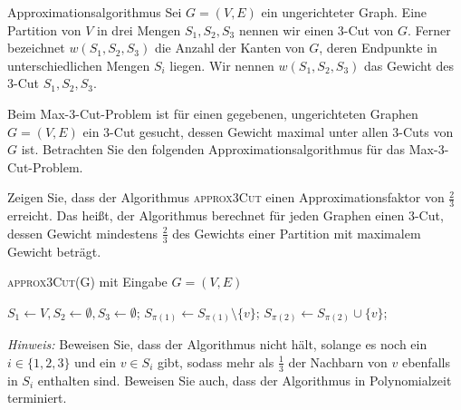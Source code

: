 \documentclass[answers]{submit}
\begin{document}
\begin{exercise}[6]{Approximationsalgorithmus}
  Sei $G=(V,E)$ ein ungerichteter Graph.
  Eine Partition von $V$ in drei Mengen $S_1,S_2,S_3$ nennen wir einen 3-Cut von $G$.
  Ferner bezeichnet $w(S_1,S_2,S_3)$ die Anzahl der Kanten von $G$, deren Endpunkte in unterschiedlichen Mengen $S_i$ liegen.
  Wir nennen $w(S_1,S_2,S_3)$ das Gewicht des 3-Cut $S_1,S_2,S_3$.

  Beim Max-3-Cut-Problem ist für einen gegebenen, ungerichteten Graphen $G=(V,E)$ ein 3-Cut gesucht, dessen Gewicht maximal unter allen 3-Cuts von $G$ ist.
  Betrachten Sie den folgenden Approximationsalgorithmus für das Max-3-Cut-Problem.

  Zeigen Sie, dass der Algorithmus \textsc{approx3Cut} einen Approximationsfaktor von $\frac{2}{3}$ erreicht.
  Das heißt, der Algorithmus berechnet für jeden Graphen einen 3-Cut, dessen Gewicht mindestens $\frac{2}{3}$ des Gewichts einer Partition mit maximalem Gewicht beträgt.

  \begin{algorithm}
    \caption{\textsc{approx3Cut}(G) mit Eingabe $G=(V,E)$}
    \begin{algorithmic}
      \State $S_1\leftarrow V,S_2\leftarrow \emptyset,S_3\leftarrow \emptyset$;
      \State $S_{\pi(1)}\leftarrow  S_{\pi(1)}\setminus \{ v \}$;
      \State $S_{\pi(2)}\leftarrow  S_{\pi(2)}\cup \{ v \}$;
      \EndWhile
    \end{algorithmic}
  \end{algorithm}

  \emph{Hinweis: }
  Beweisen Sie, dass der Algorithmus nicht hält, solange es noch ein $i\in \{ 1,2,3\}$ und ein $v\in S_i$ gibt, sodass mehr als $\frac{1}{3}$ der Nachbarn von $v$ ebenfalls in $S_i$ enthalten sind.
  Beweisen Sie auch, dass der Algorithmus in Polynomialzeit terminiert.

\end{exercise}
\end{document}
